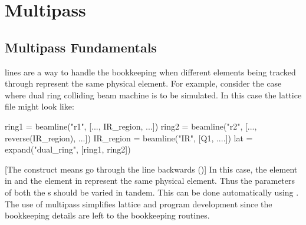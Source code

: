 \chapter{Multipass}
\label{s:multipass}

\section{Multipass Fundamentals}
\label{s:multipass.fund}

 lines are a way to handle the bookkeeping when different elements being tracked
through represent the same physical element. For example, consider the case where dual ring colliding
beam machine is to be simulated. In this case the lattice file might look like:
\begin{example}
  ring1 = beamline("r1", [..., IR_region, ...])
  ring2 = beamline("r2", [..., reverse(IR_region), ...])
  IR_region = beamline("IR", [Q1, ....])
  lat = expand("dual_ring", [ring1, ring2])
\end{example}
[The  construct means go through the line backwards ()] 
In this case, the  element in  and the
 element in  represent the same physical element.
Thus the parameters
of both the s should be varied in tandem. This can be done automatically using .
The use of multipass simplifies lattice and program development since the bookkeeping details are left
to the \accellat bookkeeping routines.

